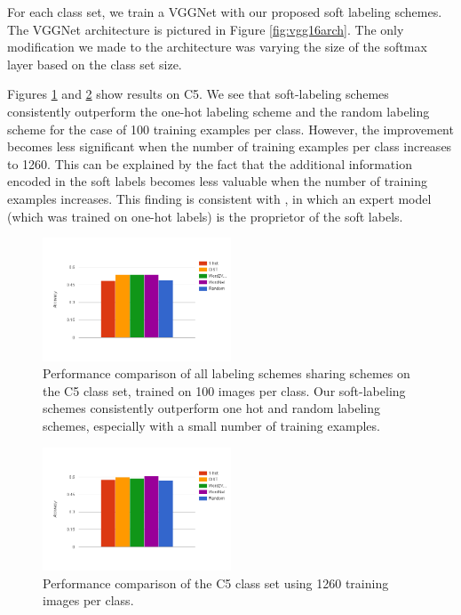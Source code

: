 For each class set, we train a VGGNet with our proposed soft labeling schemes.
The VGGNet architecture is pictured in Figure \ref{fig:vgg16arch}. The only
modification we made to the architecture was varying the size of the softmax
layer based on the class set size.

Figures \ref{fig:5_1-train_100} and \ref{fig:5_1-train_1260} show results on
C5. We see that soft-labeling schemes consistently outperform the
one-hot labeling scheme and the random labeling scheme for the case of 100
training examples per class. However, the improvement becomes less significant
when the number of training examples per class increases to 1260. This can be
explained by the fact that the additional information encoded in the soft labels
becomes less valuable when the number of training examples increases. This
finding is consistent with \cite{hinton2015distilling}, in which an expert model
(which was trained on one-hot labels) is the proprietor of the soft labels.

\begin{figure}[t]
  \centering
  \includegraphics[width=0.5\textwidth]{figs/5_1-train_100.png}
  \caption{
      Performance comparison of all labeling schemes sharing schemes on the C5 class
      set, trained on 100 images per class. Our soft-labeling schemes
      consistently outperform one hot and random labeling schemes, especially
      with a small number of training examples.
  }
  \label{fig:5_1-train_100}
\end{figure}

\begin{figure}[t]
  \centering
  \includegraphics[width=0.5\textwidth]{figs/5_1-train_1260.png}
  \caption{
      Performance comparison of the C5 class set using 1260 training images
      per class.
  }
  \label{fig:5_1-train_1260}
\end{figure}

